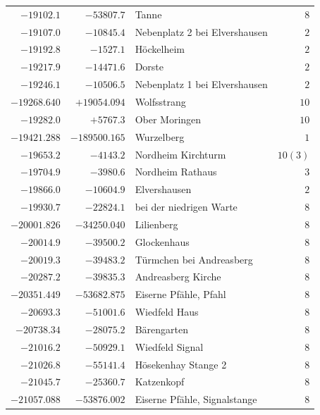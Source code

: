 \begin{center}
\begin{tabular}{r|r|p{170pt}|r}
\(-19102.1\)&\(-53807.7\)&Tanne&\(8\)\\
\(-19107.0\)&\(-10845.4\)&Nebenplatz 2 bei Elvershausen&\(2\)\\
\(-19192.8\)&\(-1527.1\)&Höckelheim&\(2\)\\
\(-19217.9\)&\(-14471.6\)&Dorste&\(2\)\\
\(-19246.1\)&\(-10506.5\)&Nebenplatz 1 bei Elvershausen&\(2\)\\
\(-19268.640\)&\(+19054.094\)&Wolfsstrang&\(10\)\\
\(-19282.0\)&\(+5767.3\)&Ober Moringen&\(10\)\\
\(-19421.288\)&\(-189500.165\)&Wurzelberg&\(1\)\\
\(-19653.2\)&\(-4143.2\)&Nordheim Kirchturm&\(10 (3)\)\\
\(-19704.9\)&\(-3980.6\)&Nordheim Rathaus&\(3\)\\
\(-19866.0\)&\(-10604.9\)&Elvershausen&\(2\)\\
\(-19930.7\)&\(-22824.1\)&bei der niedrigen Warte&\(8\)\\
\(-20001.826\)&\(-34250.040\)&Lilienberg&\(8\)\\
\(-20014.9\)&\(-39500.2\)&Glockenhaus&\(8\)\\
\(-20019.3\)&\(-39483.2\)&Türmchen bei Andreasberg&\(8\)\\
\(-20287.2\)&\(-39835.3\)&Andreasberg Kirche&\(8\)\\
\(-20351.449\)&\(-53682.875\)&Eiserne Pfähle, Pfahl&\(8\)\\
\(-20693.3\)&\(-51001.6\)&Wiedfeld Haus&\(8\)\\
\(-20738.34\)&\(-28075.2\)&Bärengarten&\(8\)\\
\(-21016.2\)&\(-50929.1\)&Wiedfeld Signal&\(8\)\\
\(-21026.8\)&\(-55141.4\)&Hösekenhay Stange 2&\(8\)\\
\(-21045.7\)&\(-25360.7\)&Katzenkopf&\(8\)\\
\(-21057.088\)&\(-53876.002\)&Eiserne Pfähle, Signalstange&\(8\)\\
\hline\end{tabular}\endgroup\end{center}
